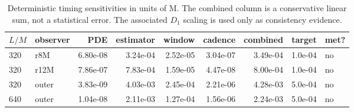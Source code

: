 \begin{table}
\centering
\small
\caption{Deterministic timing sensitivities in units of M. The combined column is a conservative linear sum, not a statistical error. The associated $D_1$ scaling is used only as consistency evidence.}
\label{tab:timing-sensitivities}
\begin{tabular}{llrrrrrrl}
\toprule
$L/M$ & observer & PDE & estimator & window & cadence & combined & target & met? \\
\midrule
320 & r8M & 6.80e-08 & 3.24e-04 & 2.52e-05 & 3.04e-07 & 3.49e-04 & 1.0e-04 & no \\
320 & r12M & 7.86e-07 & 7.83e-04 & 1.59e-05 & 4.47e-08 & 8.00e-04 & 1.0e-04 & no \\
320 & outer & 3.83e-09 & 4.03e-03 & 2.45e-04 & 2.21e-06 & 4.28e-03 & 5.0e-04 & no \\
640 & outer & 1.04e-08 & 2.11e-03 & 1.27e-04 & 1.56e-06 & 2.24e-03 & 5.0e-04 & no \\
\bottomrule
\end{tabular}
\end{table}
